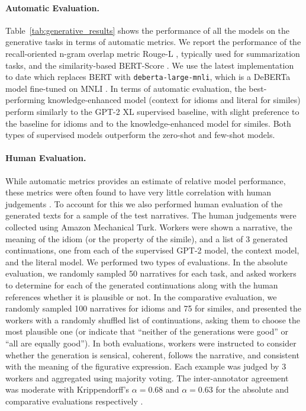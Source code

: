 



\paragraph{Automatic Evaluation.} Table~\ref{tab:generative_results} shows the performance of all the models on the generative tasks in terms of automatic metrics. We report the performance of the recall-oriented n-gram overlap metric Rouge-L \cite{lin-2004-rouge}, typically used for summarization tasks, and the similarity-based BERT-Score \cite{zhang2019bertscore}. We use the latest  implementation to date which replaces BERT with \texttt{deberta-large-mnli}, which is a DeBERTa model \cite{he2020deberta} fine-tuned on MNLI \cite{williams-etal-2018-broad}. In terms of automatic evaluation, the best-performing knowledge-enhanced model (context for idioms and literal for similes) perform similarly to the GPT-2 XL supervised baseline, with slight preference to the baseline for idioms and to the knowledge-enhanced model for similes. Both types of supervised models outperform the zero-shot and few-shot models. 






\paragraph{Human Evaluation.}
While automatic metrics provides an estimate of relative model performance, these metrics were often found to have very little correlation with human judgements \cite{novikova-etal-2017-need,krishna2021hurdles}. To account for this we also performed human evaluation of the generated texts for a sample of the test narratives. The human judgements were collected using Amazon Mechanical Turk. Workers were shown a narrative, the meaning of the idiom (or the property of the simile), and a list of 3 generated continuations, one from each of the supervised GPT-2 model, the context model, and the literal model. We performed two types of evaluations. In the absolute evaluation, we randomly sampled 50 narratives for each task, and asked workers to determine for each of the generated continuations along with the human references whether it is plausible or not. In the comparative evaluation, we randomly sampled 100 narratives for idioms and 75 for similes, and presented the workers with a randomly shuffled list of continuations, asking them to choose the most plausible one (or indicate that ``neither of the generations were good'' or ``all are equally good''). In both evaluations, workers were instructed to consider whether the generation is sensical, coherent, follows the narrative, and consistent with the meaning of the figurative expression. Each example was judged by 3 workers and aggregated using majority voting. The inter-annotator agreement was moderate with Krippendorff's $\alpha = 0.68$ and $\alpha = 0.63$ for the absolute and comparative evaluations respectively \cite{Krippendorff2011ComputingKA}. 

